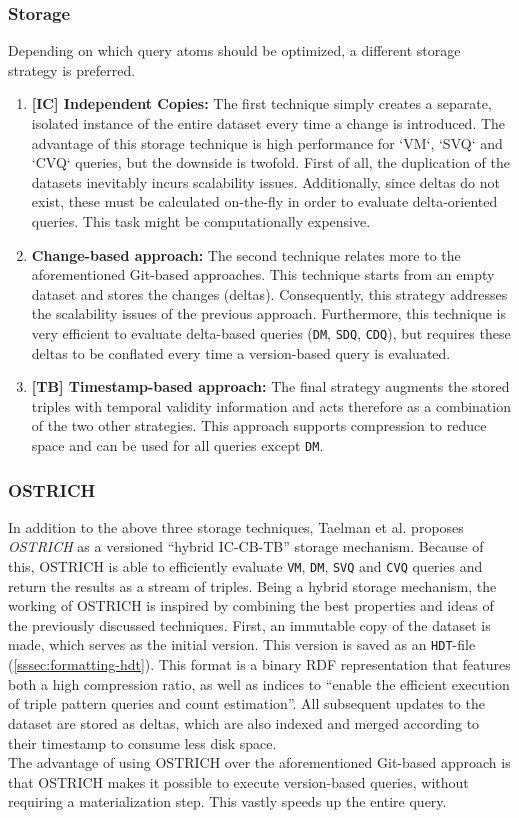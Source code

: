 \subsubsection{Storage}\label{versioning-rdfarchives-storage}
Depending on which query atoms should be optimized, a different storage strategy is preferred.

\begin{enumerate}
    \item \textbf{[IC] Independent Copies:} The first technique simply creates a separate, isolated instance of the entire dataset every time a change is introduced. The advantage of this storage technique is high performance for `VM`, `SVQ` and `CVQ` queries, but the downside is twofold. First of all, the duplication of the datasets inevitably incurs scalability issues. Additionally, since deltas do not exist, these must be calculated on-the-fly in order to evaluate delta-oriented queries. This task might be computationally expensive.
    
    \item \textbf{Change-based approach:} The second technique relates more to the aforementioned Git-based approaches. This technique starts from an empty dataset and stores the changes (deltas). Consequently, this strategy addresses the scalability issues of the previous approach. Furthermore, this technique is very efficient to evaluate delta-based queries (\texttt{DM}, \texttt{SDQ}, \texttt{CDQ}), but requires these deltas to be conflated every time a version-based query is evaluated.
    
    \item \textbf{[TB] Timestamp-based approach:} The final strategy augments the stored triples with temporal validity information and acts therefore as a combination of the two other strategies. This approach supports compression to reduce space and can be used for all queries except \texttt{DM}.
\end{enumerate}

\subsubsection{OSTRICH}
In addition to the above three storage techniques, Taelman et al. \cite{rdfostrich,rdfostrichfull} proposes \emph{OSTRICH} as a versioned ``hybrid IC-CB-TB'' storage mechanism. Because of this, OSTRICH is able to efficiently evaluate \texttt{VM}, \texttt{DM}, \texttt{SVQ} and \texttt{CVQ} queries and return the results as a stream of triples. Being a hybrid storage mechanism, the working of OSTRICH is inspired by combining the best properties and ideas of the previously discussed techniques. First, an immutable copy of the dataset is made, which serves as the initial version. This version is saved as an \texttt{HDT}-file (\cref{sssec:formatting-hdt}). This format is a binary RDF representation that features both a high compression ratio, as well as indices to ``enable the efficient execution of triple pattern queries and count estimation''. All subsequent updates to the dataset are stored as deltas, which are also indexed and merged according to their timestamp to consume less disk space.\\

\noindent The advantage of using OSTRICH over the aforementioned Git-based approach is that OSTRICH makes it possible to execute version-based queries, without requiring a materialization step. This vastly speeds up the entire query.